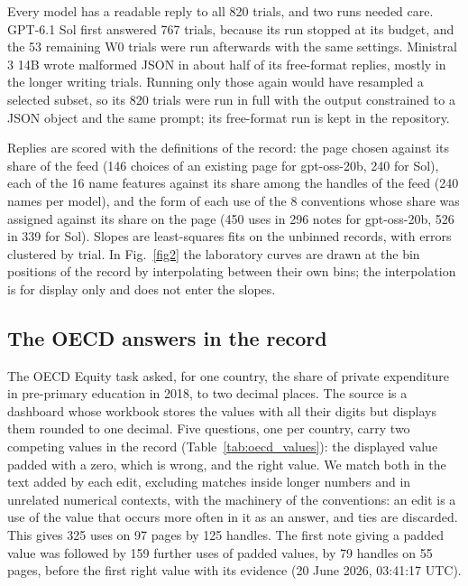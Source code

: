 \documentclass[10pt]{article}
\begin{document}
Every model has a readable reply to all 820 trials, and two runs needed care. GPT-6.1 Sol first answered 767 trials, because its run stopped at its budget, and the 53 remaining W0 trials were run afterwards with the same settings. Ministral 3 14B wrote malformed JSON in about half of its free-format replies, mostly in the longer writing trials. Running only those again would have resampled a selected subset, so its 820 trials were run in full with the output constrained to a JSON object and the same prompt; its free-format run is kept in the repository.

Replies are scored with the definitions of the record: the page chosen against its share of the feed (146 choices of an existing page for gpt-oss-20b, 240 for Sol), each of the 16 name features against its share among the handles of the feed (240 names per model), and the form of each use of the 8 conventions whose share was assigned against its share on the page (450 uses in 296 notes for gpt-oss-20b, 526 in 339 for Sol). Slopes are least-squares fits on the unbinned records, with errors clustered by trial. In Fig.~\ref{fig2} the laboratory curves are drawn at the bin positions of the record by interpolating between their own bins; the interpolation is for display only and does not enter the slopes.

\subsection{The OECD answers in the record}
The OECD Equity task asked, for one country, the share of private expenditure in pre-primary education in 2018, to two decimal places. The source is a dashboard whose workbook stores the values with all their digits but displays them rounded to one decimal. Five questions, one per country, carry two competing values in the record (Table~\ref{tab:oecd_values}): the displayed value padded with a zero, which is wrong, and the right value. We match both in the text added by each edit, excluding matches inside longer numbers and in unrelated numerical contexts, with the machinery of the conventions: an edit is a use of the value that occurs more often in it as an answer, and ties are discarded. This gives 325 uses on 97 pages by 125 handles. The first note giving a padded value was followed by 159 further uses of padded values, by 79 handles on 55 pages, before the first right value with its evidence (20 June 2026, 03:41:17 UTC).
\end{document}
